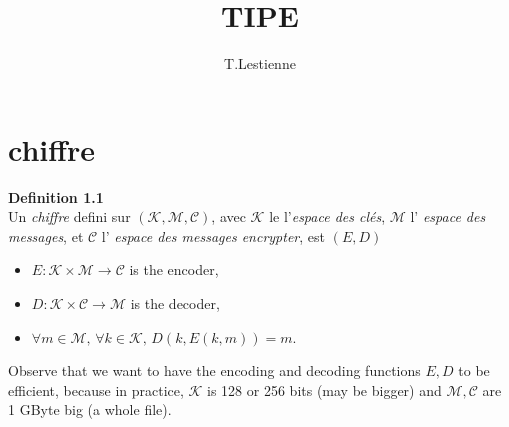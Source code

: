 \documentclass[a4paper,10pt]{article}
\title{TIPE}
\author{T.Lestienne}
\begin{document}
\maketitle

\section{chiffre}

\noindent
\textbf{Definition 1.1} \\
Un \textit{chiffre} defini sur $(\mathcal{K}, \mathcal{M}, \mathcal{C})$, avec $\mathcal{K}$ le  l'\textit{espace des clés}, $\mathcal{M}$ l' \textit{espace des messages}, et $\mathcal{C}$ l' \textit{espace des messages encrypter}, est $(E, D)$
\begin{itemize}
    \item $E : \mathcal{K} \times \mathcal{M} \to \mathcal{C}$ is the encoder,
    \item $D : \mathcal{K} \times \mathcal{C} \to \mathcal{M}$ is the decoder,
    \item $\forall m \in \mathcal{M}, \, \forall k \in \mathcal{K}, \, D(k, E(k, m)) = m$.
\end{itemize}

\noindent
Observe that we want to have the encoding and decoding functions $E, D$ to be efficient, because in practice, $\mathcal{K}$ is 128 or 256 bits (may be bigger) and $\mathcal{M}, \mathcal{C}$ are 1 GByte big (a whole file).
\end{document}

